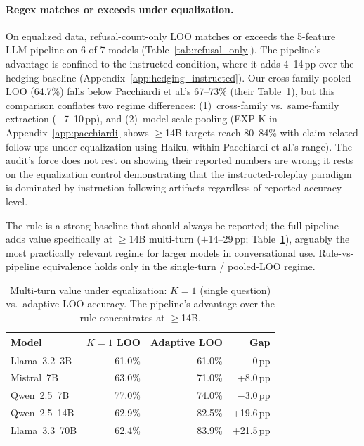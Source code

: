 \paragraph{Regex matches or exceeds under equalization.} On equalized data, refusal-count-only LOO matches or exceeds the 5-feature LLM pipeline on 6 of 7 models (Table~\ref{tab:refusal_only}). The pipeline's advantage is confined to the instructed condition, where it adds 4--14\,pp over the hedging baseline (Appendix~\ref{app:hedging_instructed}). Our cross-family pooled-LOO (64.7\%) falls below Pacchiardi et al.'s 67--73\% (their Table~1), but this comparison conflates two regime differences: (1)~cross-family vs.\ same-family extraction ($-$7--10\,pp), and (2)~model-scale pooling (EXP-K in Appendix~\ref{app:pacchiardi} shows $\geq$14B targets reach 80--84\% with claim-related follow-ups under equalization using Haiku, within Pacchiardi et al.'s range). The audit's force does not rest on showing their reported numbers are wrong; it rests on the equalization control demonstrating that the instructed-roleplay paradigm is dominated by instruction-following artifacts regardless of reported accuracy level.

The rule is a strong baseline that should always be reported; the full pipeline adds value specifically at $\geq$14B multi-turn ($+$14--29\,pp; Table~\ref{tab:multiturn_equalized_main}), arguably the most practically relevant regime for larger models in conversational use. Rule-vs-pipeline equivalence holds only in the single-turn / pooled-LOO regime.

\begin{table}[h]
\centering
\caption{Multi-turn value under equalization: $K=1$ (single question) vs.\ adaptive LOO accuracy. The pipeline's advantage over the rule concentrates at $\geq$14B.}
\label{tab:multiturn_equalized_main}
\begin{small}
\begin{tabular}{lrrr}
\toprule
\textbf{Model} & \textbf{$K=1$ LOO} & \textbf{Adaptive LOO} & \textbf{Gap} \\
\midrule
Llama~3.2~3B   & 61.0\% & 61.0\% & 0\,pp \\
Mistral~7B     & 63.0\% & 71.0\% & +8.0\,pp \\
Qwen~2.5~7B    & 77.0\% & 74.0\% & $-$3.0\,pp \\
Qwen~2.5~14B   & 62.9\% & 82.5\% & +19.6\,pp \\
Llama~3.3~70B  & 62.4\% & 83.9\% & +21.5\,pp \\
\bottomrule
\end{tabular}
\end{small}
\end{table}

